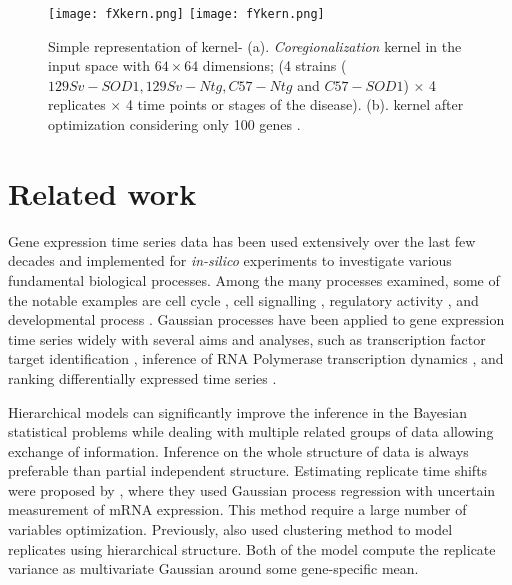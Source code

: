 \begin{figure}
 \begin{center}
 \texttt{[image: fXkern.png]}
 \texttt{[image: fYkern.png]}
\caption {Simple representation of kernel- (a). \emph{Coregionalization} kernel in the input space
 with $64\times64$ dimensions; (4 strains ($129Sv-SOD1, 129Sv-Ntg, C57-Ntg$ and $C57-SOD1$) $\times$
4 replicates $\times$ 4 time points or stages of the disease).
(b). kernel after optimization considering only 100 genes .\label{fig:kernel}}
 \end{center}
\end{figure}

\section{Related work}
Gene expression time series data has been used extensively over the last few decades and implemented for 
\textit {in-silico} experiments to investigate various fundamental biological processes. 
Among the many processes examined, some of the notable examples are cell cycle \cite{Spellman:1998}, 
cell signalling \cite{Barenco:2006}, regulatory activity \cite{Sanguinetti:2006}, 
and developmental process \cite{Tomancak:2002}. 
Gaussian processes have been applied to gene expression time series widely with several aims and analyses,
such as transcription factor target identification \cite{Honkela:2010}, 
inference of RNA Polymerase transcription dynamics \cite{Maina:2014}, 
and ranking differentially expressed time series \cite{Kalaitzis:2011}.

Hierarchical models can significantly improve the inference in the Bayesian statistical problems
\cite{Gelman:2004} while dealing with multiple related groups of data allowing 
exchange of information. Inference on the whole structure of data is always preferable than 
partial independent structure. Estimating replicate time shifts were proposed by \cite{Liu:2010},
where they used Gaussian process regression with uncertain measurement of mRNA expression. This 
method require a large number of variables optimization. 
Previously, \cite{Ng:2006} also \cite{Medvedovic:2004} used clustering method to model 
replicates using hierarchical structure. Both of the model compute the replicate variance as
multivariate Gaussian around some gene-specific mean.

